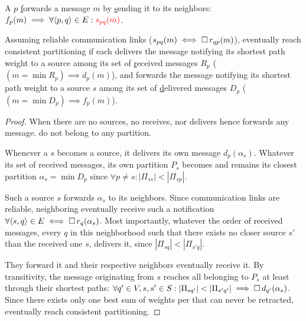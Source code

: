 \begin{definition}
  A \process $p$ \underline{f}orwards a message $m$ by
  \underline{s}ending it to its neighbors: $f_p(m) \implies \forall
  \langle p, q\rangle \in E: \textcolor{red}{s_{pq}(m)}$.
\end{definition}

\begin{theorem} Assuming reliable communication links
  ($s_{pq}(m) \iff \square\, r_{qp}(m)$), \processes eventually
  reach consistent partitioning if each \process delivers the message
  notifying its shortest path weight to a source among its set of
  \underline{r}eceived messages $R_p$ ($(m = \min R_p) \implies
  d_p(m)$), and forwards the message notifying its shortest path
  weight to a source $s$ among its set of \underline{d}elivered
  messages $D_p$ ($(m = \min D_p) \implies f_p(m)$).
\end{theorem}



\begin{proof}
  When there are no sources, no \process receives, nor delivers hence
  forwards any message. \Processes do not belong to any partition.
  
  \noindent Whenever a \process $s$ becomes a source, it delivers its
  own message $d_p(\alpha_{s})$. Whatever its set of received
  messages, its own partition $P_s$ becomes and remains its closest
  partition $\alpha_{s} = \min D_p$ since $\forall p \neq s: |\Pi_{s
    s}| < |\Pi_{s p}|$.

  \noindent Such a source $s$ forwards $\alpha_{s}$ to its neighbors.
  Since communication links are reliable, neighboring \processes
  eventually receive such a notification $\forall \langle s, q \rangle
  \in E \iff \square\, r_q(\alpha_{s})$. Most importantly,
  whatever the order of received messages, every \process $q$ in this
  neighborhood such that there exists no closer source $s'$ than the
  received one $s$, delivers it, since $|\Pi_{sq}| < |\Pi_{s'q}|$.

  \noindent They forward it and their respective neighbors eventually
  receive it. By transitivity, the message originating from $s$
  reaches all \processes belonging to $P_s$ at least through their
  shortest paths: $\forall q' \in V, s, s' \in S: |\Pi_{s q'}| <
  |\Pi_{s' q'}| \implies \square\, d_{q'}(\alpha_{s})$.  Since there
  exists only one best sum of weights per \process that can never be
  retracted, \processes eventually reach consistent partitioning.
\end{proof}

